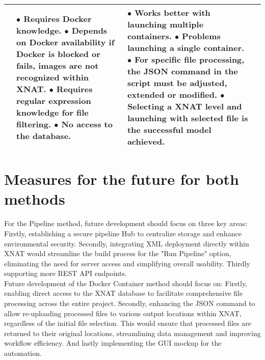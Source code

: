 \begin{table}[htbp]
\begin{tabular}{|p{1cm}|p{3cm}|p{5cm}|p{4cm}|}
{}
&
\parbox[t]{6cm}{
$\bullet$ Requires Docker knowledge. \\
$\bullet$ Depends on Docker availability \\if Docker is blocked or fails, \\images are not recognized\\ within XNAT. \\
$\bullet$ Requires regular expression\\ knowledge for file filtering. \\
$\bullet$ No access to the database. \\

}
&
\parbox[t]{4cm}{
$\bullet$ Works better with launching multiple containers. \\
$\bullet$ Problems launching a single container. \\
$\bullet$ For specific file processing, the JSON command in the script must be adjusted, extended or modified.\\
$\bullet$ Selecting a XNAT level and launching with selected file is the successful model achieved. 
} \\
\hline
\end{tabular}
\label{tab:docker_pipeline}
\end{table}


\section{Measures for the future for both methods}

For the Pipeline method, future development should focus on three key areas: Firstly, establishing a secure pipeline Hub to centralize storage and enhance environmental security. Secondly, integrating XML deployment directly within XNAT would streamline the build process for the "Run Pipeline" option, eliminating the need for server access and simplifying overall usability. Thirdly supporting more REST API endpoints.\\
Future development of the Docker Container method should focus on: Firstly, enabling direct access to the XNAT database to facilitate comprehensive file processing across the entire project. Secondly, enhancing the JSON command to allow re-uploading processed files to various output locations within XNAT, regardless of the initial file selection. This would ensure that processed files are returned to their original locations, streamlining data management and improving workflow efficiency. And lastly implementing the GUI mockup for the automation.



